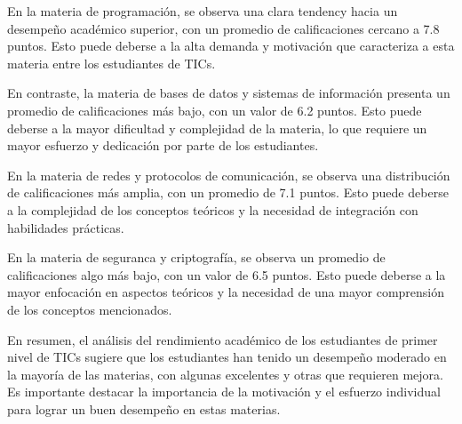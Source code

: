 En la materia de programación, se observa una clara tendency hacia un desempeño académico superior, con un promedio de calificaciones cercano a 7.8 puntos. Esto puede deberse a la alta demanda y motivación que caracteriza a esta materia entre los estudiantes de TICs.

En contraste, la materia de bases de datos y sistemas de información presenta un promedio de calificaciones más bajo, con un valor de 6.2 puntos. Esto puede deberse a la mayor dificultad y complejidad de la materia, lo que requiere un mayor esfuerzo y dedicación por parte de los estudiantes.

En la materia de redes y protocolos de comunicación, se observa una distribución de calificaciones más amplia, con un promedio de 7.1 puntos. Esto puede deberse a la complejidad de los conceptos teóricos y la necesidad de integración con habilidades prácticas.

En la materia de seguranca y criptografía, se observa un promedio de calificaciones algo más bajo, con un valor de 6.5 puntos. Esto puede deberse a la mayor enfocación en aspectos teóricos y la necesidad de una mayor comprensión de los conceptos mencionados.

En resumen, el análisis del rendimiento académico de los estudiantes de primer nivel de TICs sugiere que los estudiantes han tenido un desempeño moderado en la mayoría de las materias, con algunas excelentes y otras que requieren mejora. Es importante destacar la importancia de la motivación y el esfuerzo individual para lograr un buen desempeño en estas materias.\\
\vspace{1cm}